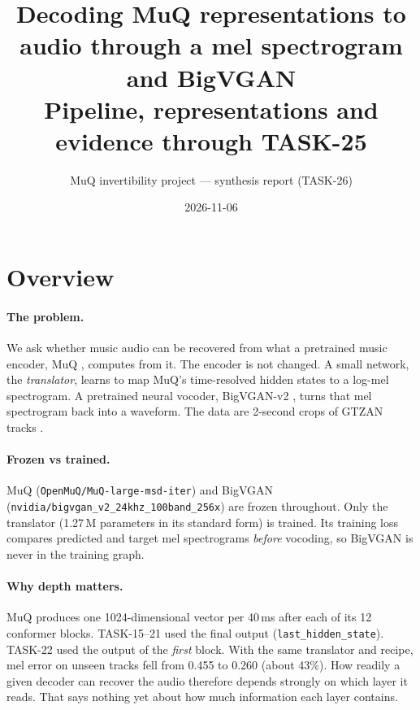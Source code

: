 \documentclass[10pt,letterpaper]{article}
\title{\textbf{Decoding MuQ representations to audio through a mel spectrogram and BigVGAN}\\[2pt]
\large Pipeline, representations and evidence through TASK-25}
\author{MuQ invertibility project --- synthesis report (TASK-26)}
\date{2026-11-06}\vspace{-1em}
\begin{document}
\maketitle
\thispagestyle{empty}
\vspace{-1.5em}

\section*{Overview}
\label{sec:overview}
\begingroup\small

\paragraph{The problem.} We ask whether music audio can be recovered from what a pretrained music encoder, MuQ \citep{zhu2025muq}, computes from it. The encoder is not changed. A small network, the \emph{translator}, learns to map MuQ's time-resolved hidden states to a log-mel spectrogram. A pretrained neural vocoder, BigVGAN-v2 \citep{lee2023bigvgan}, turns that mel spectrogram back into a waveform. The data are 2-second crops of GTZAN tracks \citep{tzanetakis2002gtzan}.

\paragraph{Frozen vs trained.} MuQ (\texttt{OpenMuQ/MuQ-large-msd-iter}) and BigVGAN (\texttt{nvidia/bigvgan\_v2\_24khz\_100band\_256x}) are frozen throughout. Only the translator (1.27\,M parameters in its standard form) is trained. Its training loss compares predicted and target mel spectrograms \emph{before} vocoding, so BigVGAN is never in the training graph.

\paragraph{Why depth matters.} MuQ produces one 1024-dimensional vector per 40\,ms after each of its 12 conformer blocks. TASK-15--21 used the final output (\texttt{last\_hidden\_state}). TASK-22 used the output of the \emph{first} block. With the same translator and recipe, mel error on unseen tracks fell from 0.455 to 0.260 (about 43\%). How readily a given decoder can recover the audio therefore depends strongly on which layer it reads. That says nothing yet about how much information each layer contains.
\end{document}
